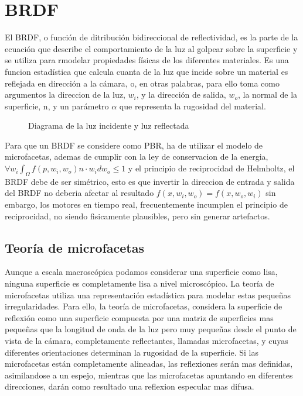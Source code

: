 \section{BRDF}

El BRDF, o función de ditribuci\'on bidireccional de reflectividad, es la parte de la ecuaci\'on que describe el
comportamiento de la luz al golpear sobre la superficie y se utiliza para rmodelar propiedades f\'isicas de los diferentes
materiales. Es una funcion estad\'istica que calcula cuanta de la luz que incide sobre un material es reflejada en direcci\'on
a la c\'amara, o, en otras palabras, para ello toma como argumentos la direccion de la luz, $w_i$, y la dirección de salida,
$w_o$, la normal de la superficie, n, y un par\'ametro $\alpha$ que representa la rugosidad del material.

\begin{figure}[H]
    \vspace{0.5cm}
    \centering
    \caption{Diagrama de la luz incidente y luz reflectada}
    \vspace{0.5cm}
\end{figure}

Para que un BRDF se considere como PBR, ha de utilizar el modelo de microfacetas, ademas de cumplir con la ley de conservacion
de la energia, $\forall w_i \int_{\Omega} f(p, w_i, w_o) n\cdot{w_i} dw_o \leq 1$ y el principio de reciprocidad de Helmholtz,
el BRDF debe de ser simétrico, esto es que invertir la direccion de entrada y salida del BRDF no deberia afectar al resultado
$f(x, w_i, w_o) = f(x, w_o, w_i)$ sin embargo, los motores en tiempo real, frecuentemente incumplen el principio de reciprocidad,
no siendo fisicamente plausibles, pero sin generar artefactos.\\

    \subsection{Teor\'ia de microfacetas}

    \bgroup

        Aunque a escala macrosc\'opica podamos considerar una superficie como lisa, ninguna superficie es completamente lisa a nivel
        microsc\'opico. La teor\'ia de microfacetas utiliza una representaci\'on estad\'istica para modelar estas peque\~nas irregularidades.
        Para ello, la teor\'ia de microfacetas, considera la superficie de reflexi\'on como una superficie compuesta por una matriz de
        superficies mas peque\~nas que la longitud de onda de la luz pero muy peque\~nas desde el punto de vista de la c\'amara,
        completamente reflectantes, llamadas microfacetas, y cuyas diferentes orientaciones determinan la rugosidad de la superficie.
        Si las microfacetas est\'an completamente alineadas, las reflexiones ser\'an mas definidas, asimilandose a un espejo, mientras
        que las microfacetas apuntando en diferentes direcciones, dar\'an como resultado una reflexion especular mas difusa.


